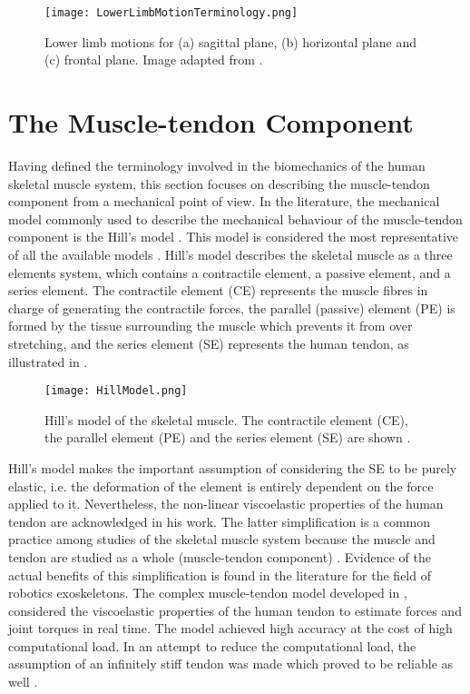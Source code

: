 \begin{figure}[htbp!]
	\centering
	\texttt{[image: LowerLimbMotionTerminology.png]}
	\caption[Lower limb motions for (a) sagittal plane, (b) horizontal plane and (c) frontal plane.]{Lower limb motions for (a) sagittal plane, (b) horizontal plane and (c) frontal plane. Image adapted from  \cite{PhysicalSolutions2016}. }
	\label{fig:lower_motion}
\end{figure}

\newpage

\section{The Muscle-tendon Component} \label{sec:muscle_tendon}

Having defined the terminology involved in the biomechanics of the human skeletal muscle system, this section focuses on describing the muscle-tendon component from a mechanical point of view. In the literature, the mechanical model commonly used to describe the mechanical behaviour of the muscle-tendon component is the Hill's model \cite{hill1938heat}. This model is considered the most representative of all the available models \cite{zhang2012sma}. Hill's model describes the skeletal muscle as a three elements system, which contains a contractile element, a passive element, and a series element. The contractile element (CE) represents the muscle fibres in charge of generating the contractile forces, the parallel (passive) element (PE) is formed by the tissue surrounding the muscle which prevents it from over stretching, and the series element (SE) represents the human tendon, as illustrated in .

\begin{figure}[htb!]
	\centering
	\texttt{[image: HillModel.png]}
	\caption[Hill's model of the skeletal muscle. The contractile element (CE), the parallel element (PE) and the series element (SE) are shown.]{Hill's model of the skeletal muscle. The contractile element (CE), the parallel element (PE) and the series element (SE) are shown \cite{hill1938heat}. }
	\label{fig:hillModel}
\end{figure}

Hill's model makes the important assumption of considering the SE to be purely elastic, i.e. the deformation of the element is entirely dependent on the force applied to it. Nevertheless, the non-linear viscoelastic properties of the human tendon are acknowledged in his work. The latter simplification is a common practice among studies of the skeletal muscle system because the muscle and tendon are studied as a whole (muscle-tendon component) \cite{zajac1989muscle}. Evidence of the actual benefits of this simplification is found in the literature for the field of robotics exoskeletons. The complex muscle-tendon model developed in \cite{lloyd2003emg}, considered the viscoelastic properties of the human tendon to estimate forces and joint torques in real time. The model achieved high accuracy at the cost of high computational load. In an attempt to reduce the computational load, the assumption of an infinitely stiff tendon was made which proved to be reliable as well \cite{sartori2009stiff}.

